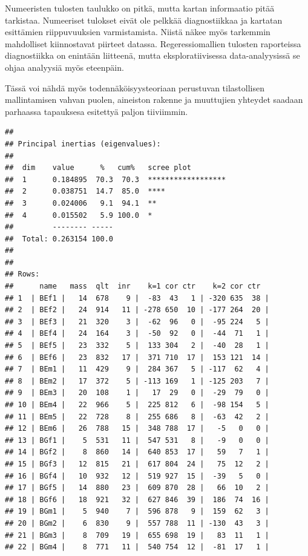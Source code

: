 \documentclass[
  finnish,
]{book}
\begin{document}
Numeeristen tulosten taulukko on pitkä, mutta kartan informaatio pitää tarkistaa.
Numeeriset tulokset eivät ole pelkkää diagnostiikkaa ja kartatan esittämien
riippuvuuksien varmistamista. Niistä näkee myös tarkemmin mahdolliset kiinnostavat
piirteet datassa. Regeressiomallien tulosten raporteissa diagnostiikka on enintään
liitteenä, mutta eksploratiivisessa data-analyysissä se ohjaa analyysiä myös eteenpäin.

Tässä voi nähdä myös todennäköisyysteoriaan perustuvan tilastollisen mallintamisen vahvan
puolen, aineiston rakenne ja muuttujien yhteydet saadaan parhaassa tapauksesa esitettyä
paljon tiiviimmin.

\begin{verbatim}
## 
## Principal inertias (eigenvalues):
## 
##  dim    value      %   cum%   scree plot               
##  1      0.184895  70.3  70.3  ******************       
##  2      0.038751  14.7  85.0  ****                     
##  3      0.024006   9.1  94.1  **                       
##  4      0.015502   5.9 100.0  *                        
##         -------- -----                                 
##  Total: 0.263154 100.0                                 
## 
## 
## Rows:
##      name   mass  qlt  inr    k=1 cor ctr    k=2 cor ctr  
## 1  | BEf1 |   14  678    9 |  -83  43   1 | -320 635  38 |
## 2  | BEf2 |   24  914   11 | -278 650  10 | -177 264  20 |
## 3  | BEf3 |   21  320    3 |  -62  96   0 |  -95 224   5 |
## 4  | BEf4 |   24  164    3 |  -50  92   0 |  -44  71   1 |
## 5  | BEf5 |   23  332    5 |  133 304   2 |  -40  28   1 |
## 6  | BEf6 |   23  832   17 |  371 710  17 |  153 121  14 |
## 7  | BEm1 |   11  429    9 |  284 367   5 | -117  62   4 |
## 8  | BEm2 |   17  372    5 | -113 169   1 | -125 203   7 |
## 9  | BEm3 |   20  108    1 |   17  29   0 |  -29  79   0 |
## 10 | BEm4 |   22  966    5 |  225 812   6 |  -98 154   5 |
## 11 | BEm5 |   22  728    8 |  255 686   8 |  -63  42   2 |
## 12 | BEm6 |   26  788   15 |  348 788  17 |   -5   0   0 |
## 13 | BGf1 |    5  531   11 |  547 531   8 |   -9   0   0 |
## 14 | BGf2 |    8  860   14 |  640 853  17 |   59   7   1 |
## 15 | BGf3 |   12  815   21 |  617 804  24 |   75  12   2 |
## 16 | BGf4 |   10  932   12 |  519 927  15 |  -39   5   0 |
## 17 | BGf5 |   14  880   23 |  609 870  28 |   66  10   2 |
## 18 | BGf6 |   18  921   32 |  627 846  39 |  186  74  16 |
## 19 | BGm1 |    5  940    7 |  596 878   9 |  159  62   3 |
## 20 | BGm2 |    6  830    9 |  557 788  11 | -130  43   3 |
## 21 | BGm3 |    8  709   19 |  655 698  19 |   83  11   1 |
## 22 | BGm4 |    8  771   11 |  540 754  12 |  -81  17   1 |

\end{verbatim}
\end{document}
